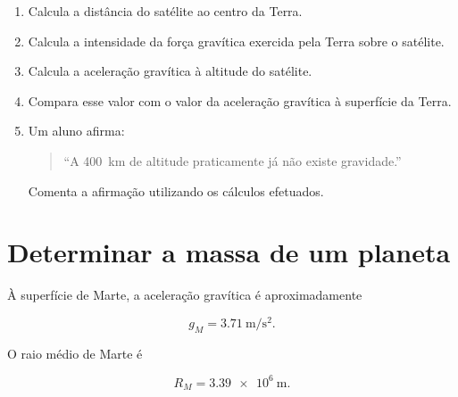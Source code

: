\documentclass[11pt,a4paper]{article}
\newcommand{\resposta}[1][1]{
	\vspace{#1cm}
}
\begin{document}
	\begin{enumerate}[label=\textbf{\arabic*.},resume]
		
		\item Calcula a distância do satélite ao centro da Terra.
		
		\resposta[0.8]
		
		\item Calcula a intensidade da força gravítica exercida pela Terra sobre
		o satélite.
		
		\resposta[1.3]
		
		\item Calcula a aceleração gravítica à altitude do satélite.
		
		\resposta[1.2]
		
		\item Compara esse valor com o valor da aceleração gravítica à superfície
		da Terra.
		
		\resposta[1.0]
		
		\item Um aluno afirma:
		
		\begin{quote}
			``A \SI{400}{\kilo\metre} de altitude praticamente já não existe
			gravidade.''
		\end{quote}
		
		Comenta a afirmação utilizando os cálculos efetuados.
		
		\resposta[1.1]
		
	\end{enumerate}
	
	\section{Determinar a massa de um planeta}
	
	À superfície de Marte, a aceleração gravítica é aproximadamente
	
	\[
	g_M=\SI{3.71}{\metre\per\second\squared}.
	\]
	
	O raio médio de Marte é
	
	\[
	R_M=\SI{3.39e6}{\metre}.
	\]
	
\end{document}
